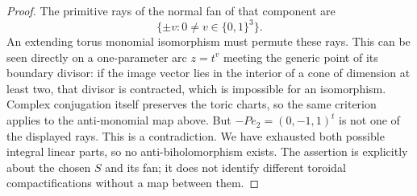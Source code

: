 \begin{proof}
The primitive rays of the normal fan of that component are
\[
\{\pm v:0\ne v\in\{0,1\}^3\}.
\]
An extending torus monomial isomorphism must permute these rays.
This can be seen directly on a one-parameter arc $z=t^v$ meeting the
generic point of its boundary divisor: if the image vector lies in
the interior of a cone of dimension at least two, that divisor is
contracted, which is impossible for an isomorphism.  Complex
conjugation itself preserves the toric charts, so the same criterion
applies to the anti-monomial map above.
But $-Pe_2=(0,-1,1)^t$ is not one of the displayed rays.
This is a contradiction.  We have exhausted both possible integral
linear parts, so no anti-biholomorphism exists.
The assertion is explicitly about the chosen $S$ and its fan; it does
not identify different toroidal compactifications without a map
between them.
\end{proof}

